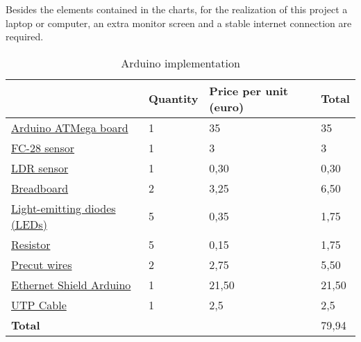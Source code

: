 Besides the elements contained in the charts, for the realization of this project a laptop or computer, an extra monitor screen and a stable internet connection are required.

\begin{table}[H]
\caption{Arduino implementation}
\begin{tabular}{llll}
\hline
	& \textbf{Quantity}& \textbf{Price per unit (euro)}& \textbf{Total} \\ \hline
	\rowcolor{lightgray}
\href{https://store.arduino.cc/arduino-mega-2560-rev3}{Arduino ATMega board} & 1                                        & 35                                                 & 35                                    \\
\href{https://televoz.org/9496_128fc28_modulo-para-arduino-igrometro---sensor-de-humedad-fc28}{FC-28 sensor}         & 1                                        & 3                                                  & 3                                     \\
	\rowcolor{lightgray}
\href{https://televoz.org/5593_000ldr01_celula-fotoconductora-ldr-01}{LDR sensor}	     & 1                                        &0,30                                                    & 0,30                                      \\
\href{https://televoz.org/4859_104bp001_placa-board-400-puntos-bp001}{Breadboard}	     & 2                                        & 3,25                                                    & 6,50                                      \\
\rowcolor{lightgray}
\href{https://televoz.org/4955_105led3rojo-ab_diodo-led-3-mm-rojo-alto-brillo}{Light-emitting diodes (LEDs)}                 & 5                                        &  0,35                                                  &1,75          \\
\href{https://televoz.org/5551_001R_RESISTENCIA}{Resistor}                 & 5                                        &  0,15                                                  &1,75 \\
\rowcolor{lightgray}
\href{https://televoz.org/4861_104boardcab20_cable-para-board-20-cms-macho-macho-10-unidades}{Precut wires} & 2 & 2,75 & 5,50 \\
\href{https://store.arduino.cc/arduino-ethernet-shield-2}{Ethernet Shield Arduino} & 1 & 21,50 & 21,50 \\
\rowcolor{lightgray}
\href{https://televoz.org/conexion-utp-cat6-5-00-mts-tr4000029}{UTP Cable} & 1 & 2,5 & 2,5 \\
\textbf{Total} & & & 79,94 \\
\end{tabular}
\end{table}

